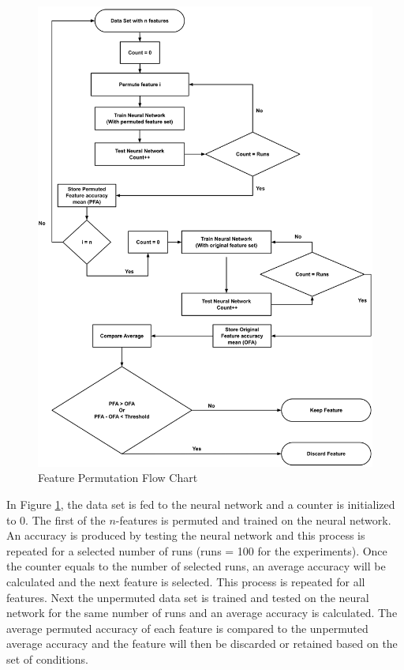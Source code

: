 \documentclass{tum-book}
\begin{document}
        \newpage
        \begin{figure}[ht]
            \centering
            \includegraphics[scale=0.5]{myFiles/myImages/Feature_Permutation.png}
            \caption{Feature Permutation Flow Chart}
            \label{fig:Feature Permutation Flow Chart}
        \end{figure}
        
        \bigskip\noindent
        In Figure \ref{fig:Feature Permutation Flow Chart}, the data set is fed to the neural network and a counter is initialized to 0. The first of the $n$-features is permuted and trained on the neural network. An accuracy is produced by testing the neural network and this process is repeated for a selected number of runs (runs = 100 for the experiments). Once the counter equals to the number of selected runs, an average accuracy will be calculated and the next feature is selected. This process is repeated for all features. Next the unpermuted data set is trained and tested on the neural network for the same number of runs and an average accuracy is calculated. The average permuted accuracy of each feature is compared to the unpermuted average accuracy and the feature will then be discarded or retained based on the set of conditions.
        
\end{document}

